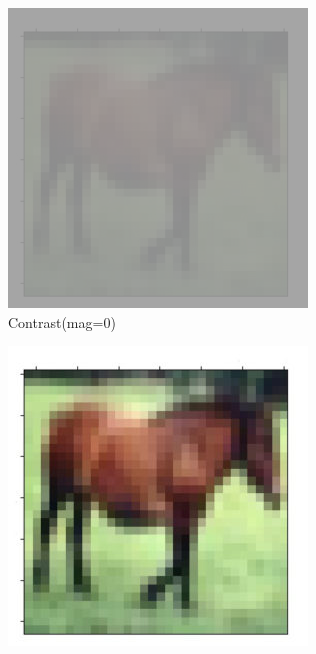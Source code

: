 \documentclass[onecolumn]{ujarticle}   %
\begin{document}
\begin{figure}[h]
      \begin{subfigure}{0.3\columnwidth}
        \centering
        \includegraphics[width=1.0\columnwidth]{transform_test/Contrast_0.png}
        \caption{Contrast(mag=0)}
        \label{fig:Contrast_0}
      \end{subfigure}
      \begin{subfigure}{0.3\columnwidth}
        \centering
        \includegraphics[width=1.0\columnwidth]{transform_test/Contrast_15.png}

\end{subfigure}
\end{figure}
\end{document}
